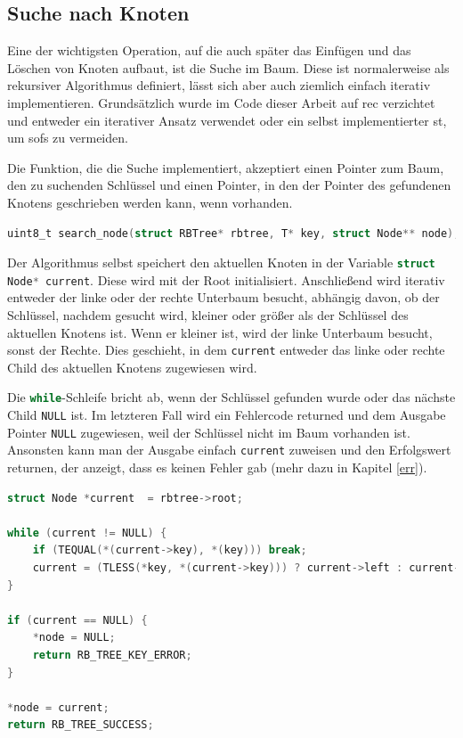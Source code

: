 \documentclass[11pt]{article}
\newcommand{\lstin}[1]{\lstinline[language=C]{#1}}
\begin{document}
\subsection{Suche nach Knoten} \label{sea}
Eine der wichtigsten Operation, auf die auch später das Einfügen und das Löschen von Knoten aufbaut, ist die Suche im Baum. Diese ist normalerweise als rekursiver Algorithmus definiert, lässt sich aber auch ziemlich einfach iterativ implementieren.
Grundsätzlich wurde im Code dieser Arbeit auf \gls{rec} verzichtet und entweder ein iterativer Ansatz verwendet oder ein selbst implementierter \gls{st}, um \glspl{sof} zu vermeiden.

Die Funktion, die die Suche implementiert, akzeptiert einen Pointer zum Baum, den zu suchenden Schlüssel und einen Pointer, in den der Pointer des gefundenen Knotens geschrieben werden kann, wenn vorhanden.

\begin{lstlisting}[language=C]
uint8_t search_node(struct RBTree* rbtree, T* key, struct Node** node);
\end{lstlisting}

Der Algorithmus selbst speichert den aktuellen Knoten in der Variable \lstin{struct Node* current}. Diese wird mit der Root initialisiert. Anschließend wird iterativ entweder der linke oder der rechte Unterbaum besucht, abhängig davon, ob der Schlüssel, nachdem gesucht wird, kleiner oder größer als der Schlüssel des aktuellen Knotens ist.
Wenn er kleiner ist, wird der linke Unterbaum besucht, sonst der Rechte. Dies geschieht, in dem \lstin{current} entweder das linke oder rechte Child des aktuellen Knotens zugewiesen wird.

Die \lstin{while}-Schleife bricht ab, wenn der Schlüssel gefunden wurde oder das nächste Child \lstin{NULL} ist. Im letzteren Fall wird ein Fehlercode returned und dem Ausgabe Pointer \lstin{NULL} zugewiesen, weil der Schlüssel nicht im Baum vorhanden ist.
Ansonsten kann man der Ausgabe einfach \lstin{current} zuweisen und den Erfolgswert returnen, der anzeigt, dass es keinen Fehler gab (mehr dazu in Kapitel \ref{err}).

\begin{lstlisting}[language=C]
struct Node *current  = rbtree->root;

while (current != NULL) {
    if (TEQUAL(*(current->key), *(key))) break;
    current = (TLESS(*key, *(current->key))) ? current->left : current->right;
}

if (current == NULL) {
    *node = NULL;
    return RB_TREE_KEY_ERROR;
}

*node = current;
return RB_TREE_SUCCESS;
\end{lstlisting}
\end{document}
